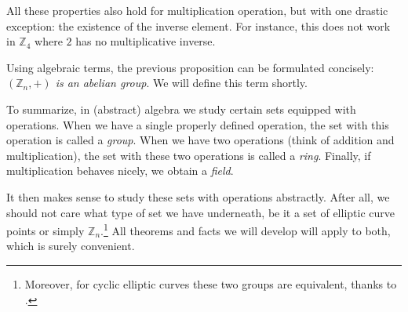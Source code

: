 \documentclass[../../book.tex]{subfiles}
\begin{document}
\vspace{-4mm}

\begin{remark}
    All these properties also hold for multiplication operation, but with one 
    drastic exception: the existence of the inverse element. 
    For instance, this does not work in $\mathbb{Z}_4$ where $2$ has no multiplicative inverse.
\end{remark}

\vspace{-1.3mm}

Using algebraic terms, the previous proposition can be formulated concisely: \emph{$(\mathbb{Z}_n,+)$ is an abelian group}.
We will define this term shortly.

To summarize, in (abstract) algebra we study certain sets equipped with operations.
When we have a single properly defined operation, the set with this operation is called a \textit{group}.
When we have two operations (think of addition and multiplication), the set with these two operations is called a \textit{ring}.
Finally, if multiplication behaves nicely, we obtain a \textit{field}.

It then makes sense to study these sets with operations abstractly.
After all, we should not care what type of set we have underneath, be it a set of elliptic curve points or simply $\mathbb{Z}_n$.\footnote{Moreover, for cyclic elliptic curves these two groups are equivalent, thanks to .}
All theorems and facts we will develop will apply to both, which is surely convenient.




\end{document}
